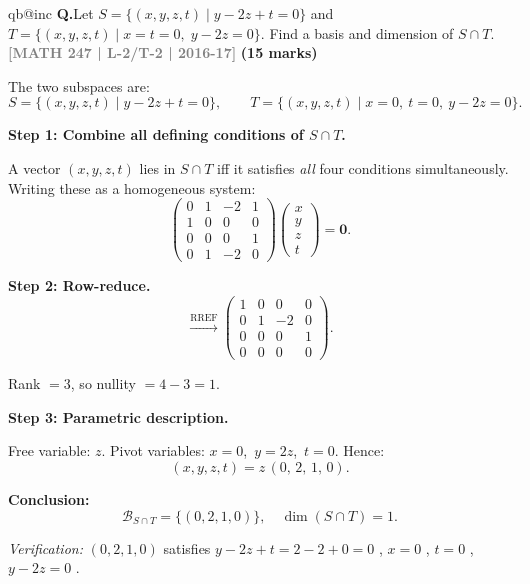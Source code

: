 \documentclass[12pt,a3paper]{article}
\makeatletter
\newcommand{\yr}[1]{\hfill\textcolor{gray}{\small\textbf{[#1]}}}
\newcommand{\mk}[1]{\textcolor{orange!70!black}{\small\textbf{(#1 marks)}}}
\newcounter{qnum}
\newcommand{\Q}[1]{%
  \csname qb@inc\endcsname
  \needspace{4\baselineskip}
  \refstepcounter{qnum}
  \vspace{6pt}
  \noindent\textbf{Q\theqnum.}\enspace #1\par
}
\makeatother
\begin{document}
\Q{Let $S = \{(x,y,z,t)\mid y - 2z + t = 0\}$ and $T = \{(x,y,z,t)\mid x = t = 0,\; y - 2z = 0\}$. Find a basis and dimension of $S \cap T$.
\yr{MATH 247 | L-2/T-2 | 2016-17} \mk{15}}

\begin{tcolorbox}[enhanced,breakable,
  colback=cC!4,colframe=cC,boxrule=0.8pt,arc=5pt,
  title={\textbf{Answer --- Basis and Dimension of $S\cap T$}},
  fonttitle=\bfseries\color{white},colbacktitle=cC]

The two subspaces are:
\[
S = \{(x,y,z,t)\mid y - 2z + t = 0\}, \qquad
T = \{(x,y,z,t)\mid x = 0,\ t = 0,\ y - 2z = 0\}.
\]

\textbf{Step 1: Combine all defining conditions of $S\cap T$.}

A vector $(x,y,z,t)$ lies in $S\cap T$ iff it satisfies \emph{all} four conditions simultaneously. Writing these as a homogeneous system:
\[
\begin{pmatrix}
0 & 1 & -2 & 1 \\
1 & 0 &  0 & 0 \\
0 & 0 &  0 & 1 \\
0 & 1 & -2 & 0
\end{pmatrix}
\begin{pmatrix}x\\y\\z\\t\end{pmatrix} = \mathbf{0}.
\]

\textbf{Step 2: Row-reduce.}
\[
\xrightarrow{\text{RREF}}
\begin{pmatrix}
1 & 0 &  0 & 0 \\
0 & 1 & -2 & 0 \\
0 & 0 &  0 & 1 \\
0 & 0 &  0 & 0
\end{pmatrix}.
\]

Rank $= 3$, so nullity $= 4 - 3 = 1$.

\textbf{Step 3: Parametric description.}

Free variable: $z$. Pivot variables: $x = 0$,\ $y = 2z$,\ $t = 0$. Hence:
\[
(x,y,z,t) = z\,(0,\,2,\,1,\,0).
\]

\textbf{Conclusion:}
\[
\boxed{\mathcal{B}_{S\cap T} = \{(0,2,1,0)\}, \quad \dim(S\cap T) = 1.}
\]

\textit{Verification: } $(0,2,1,0)$ satisfies $y-2z+t = 2-2+0 = 0$ \checkmark, $x=0$ \checkmark, $t=0$ \checkmark, $y-2z = 0$ \checkmark.

\end{tcolorbox}
\end{document}
